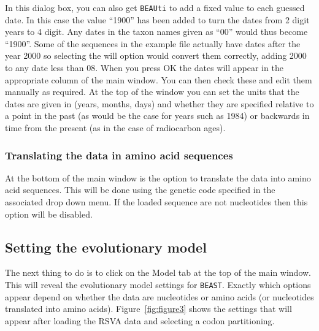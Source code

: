 \documentclass[cup7b, english]{cupbook}
\begin{document}
In this dialog box, you can also get \texttt{BEAUti} to add a fixed value to each guessed date. In this case the
value ``1900'' has been added to turn the dates from 2 digit years to 4 digit. Any dates in the taxon names
given as ``00'' would thus become ``1900''. Some of the sequences in the example file actually have dates
after the year 2000 so selecting the will option would convert them correctly, adding 2000 to any date less than 08.
When you press OK the dates will appear in the appropriate column of the main window. You can then check
these and edit them manually as required. At the top of the window you can set the units that the dates
are given in (years, months, days) and whether they are specified relative to a point in the past (as
would be the case for years such as 1984) or backwards in time from the present (as in the case of
radiocarbon ages).

\subsubsection{Translating the data in amino acid sequences}

At the bottom of the main window is the option to translate the data into amino acid sequences. This will
be done using the genetic code specified in the associated drop down menu. If the loaded sequence are not
nucleotides then this option will be disabled.

\subsection{Setting the evolutionary model}

The next thing to do is to click on the Model tab at the top of the main window. This will reveal the
evolutionary model settings for \texttt{BEAST}. Exactly which options appear depend on whether the data are
nucleotides or amino acids (or nucleotides translated into amino acids). Figure~\ref{fig:figure3}
shows the settings that will appear after loading the RSVA data and selecting a codon partitioning.
\end{document}
